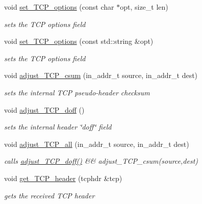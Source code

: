 \begin{CompactItemize}
void \hyperlink{classsocketpp_1_1TCP__RawSocket_c38e057fc6ece02026e71b7ee872533f}{set\_\-TCP\_\-options} (const char $\ast$opt, size\_\-t len)
\begin{CompactList}\small\item\em sets the TCP options field \item\end{CompactList}\item 
void \hyperlink{classsocketpp_1_1TCP__RawSocket_7bc9043e86c6f328cb99d98c4bfca05a}{set\_\-TCP\_\-options} (const std::string \&opt)
\begin{CompactList}\small\item\em sets the TCP options field \item\end{CompactList}\item 
void \hyperlink{classsocketpp_1_1TCP__RawSocket_c1a2ef8b2661bb0f3ca3fa6a636b25fd}{adjust\_\-TCP\_\-csum} (in\_\-addr\_\-t source, in\_\-addr\_\-t dest)
\begin{CompactList}\small\item\em sets the internal TCP pseudo-header checksum \item\end{CompactList}\item 
void \hyperlink{classsocketpp_1_1TCP__RawSocket_029eb8bfbf19531253edf046775d9f5f}{adjust\_\-TCP\_\-doff} ()
\begin{CompactList}\small\item\em sets the internal header \char`\"{}doff\char`\"{} field \item\end{CompactList}\item 
void \hyperlink{classsocketpp_1_1TCP__RawSocket_0a1017145ae76253dfca51cbd672fae7}{adjust\_\-TCP\_\-all} (in\_\-addr\_\-t source, in\_\-addr\_\-t dest)
\begin{CompactList}\small\item\em calls \hyperlink{classsocketpp_1_1TCP__RawSocket_029eb8bfbf19531253edf046775d9f5f}{adjust\_\-TCP\_\-doff()} \&\& adjust\_\-TCP\_\-csum(source,dest) \item\end{CompactList}\item 
void \hyperlink{classsocketpp_1_1TCP__RawSocket_d7e8b2a67c856e11f0e6cfff5f8b8705}{get\_\-TCP\_\-header} (tcphdr \&tcp)
\begin{CompactList}\small\item\em gets the received TCP header \item\end{CompactList}\item 

\end{CompactItemize}
